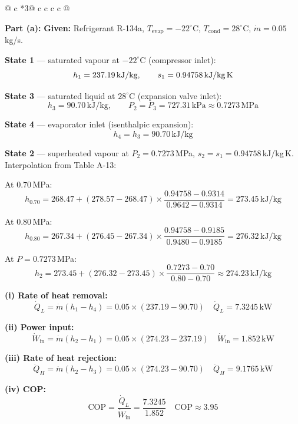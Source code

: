 \documentclass[12pt,a3paper]{article}
\begin{document}
\begin{enumerate}
\begin{center}
\begin{longtable}{@{} c *{3}{@{\hspace{12pt}} c c c c} @{}}
\end{longtable}
\end{center}

\begin{tcolorbox}[enhanced,breakable,ansbox,colback=cC!4,colframe=cC,
  boxrule=0.8pt,arc=5pt,
  title={\textbf{Solution}},fonttitle=\bfseries\color{white},colbacktitle=cC]


 \textbf{Part (a):} 
\textbf{Given:} Refrigerant R-134a,
$T_\text{evap} = -22^\circ$C,
$T_\text{cond} = 28^\circ$C,
$\dot{m} = 0.05$\,kg/s.

\medskip
\textbf{State 1} --- saturated vapour at $-22^\circ$C (compressor inlet):
\[
  h_1 = 237.19\,\text{kJ/kg}, \qquad s_1 = 0.94758\,\text{kJ/kg\,K}
\]

\textbf{State 3} --- saturated liquid at $28^\circ$C (expansion valve inlet):
\[
  h_3 = 90.70\,\text{kJ/kg}, \qquad
  P_2 = P_3 = 727.31\,\text{kPa} \approx 0.7273\,\text{MPa}
\]

\textbf{State 4} --- evaporator inlet (isenthalpic expansion):
\[
  h_4 = h_3 = 90.70\,\text{kJ/kg}
\]

\textbf{State 2} --- superheated vapour at $P_2 = 0.7273$\,MPa,
$s_2 = s_1 = 0.94758$\,kJ/kg\,K.
Interpolation from Table A-13:

At $0.70$\,MPa:
\[
  h_{0.70} = 268.47 + (278.57-268.47)\times
  \frac{0.94758-0.9314}{0.9642-0.9314} = 273.45\,\text{kJ/kg}
\]

At $0.80$\,MPa:
\[
  h_{0.80} = 267.34 + (276.45-267.34)\times
  \frac{0.94758-0.9185}{0.9480-0.9185} = 276.32\,\text{kJ/kg}
\]

At $P = 0.7273$\,MPa:
\[
  h_2 = 273.45 + (276.32-273.45)\times
  \frac{0.7273-0.70}{0.80-0.70} \approx 274.23\,\text{kJ/kg}
\]

\medskip
\textbf{(i) Rate of heat removal:}
\[
  \dot{Q}_L = \dot{m}(h_1 - h_4) = 0.05\times(237.19-90.70)
  \quad\boxed{\dot{Q}_L = 7.3245\,\text{kW}}
\]

\textbf{(ii) Power input:}
\[
  \dot{W}_\text{in} = \dot{m}(h_2 - h_1) = 0.05\times(274.23-237.19)
  \quad\boxed{\dot{W}_\text{in} = 1.852\,\text{kW}}
\]

\textbf{(iii) Rate of heat rejection:}
\[
  \dot{Q}_H = \dot{m}(h_2 - h_3) = 0.05\times(274.23-90.70)
  \quad\boxed{\dot{Q}_H = 9.1765\,\text{kW}}
\]

\textbf{(iv) COP:}
\[
  \mathrm{COP} = \frac{\dot{Q}_L}{\dot{W}_\text{in}}
  = \frac{7.3245}{1.852}
  \quad\boxed{\mathrm{COP} \approx 3.95}
\]

\medskip



\end{tcolorbox}
\end{enumerate}
\end{document}
